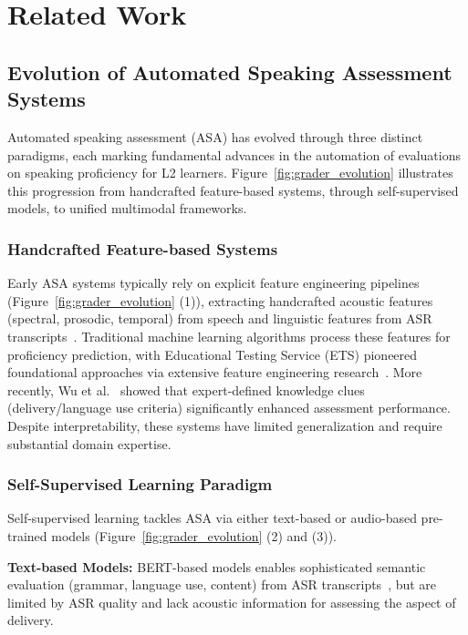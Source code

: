 \documentclass[conference]{IEEEtran}
\begin{document}
\section{Related Work}

\subsection{Evolution of Automated Speaking Assessment Systems}
Automated speaking assessment (ASA) has evolved through three distinct paradigms, each marking fundamental advances in the automation of evaluations on speaking proficiency for L2 learners. Figure~\ref{fig:grader_evolution} illustrates this progression from handcrafted feature-based systems, through self-supervised models, to unified multimodal frameworks.

\subsubsection{Handcrafted Feature-based Systems}
Early ASA systems typically rely on explicit feature engineering pipelines (Figure~\ref{fig:grader_evolution} (1)), extracting handcrafted acoustic features (spectral, prosodic, temporal) from speech and linguistic features from ASR transcripts~\cite{Davis80-COP}. Traditional machine learning algorithms process these features for proficiency prediction, with Educational Testing Service (ETS) pioneered foundational approaches via extensive feature engineering research~\cite{Loukina2015Feature,Xi2008Automated,Xie2012Exploring}. More recently, Wu et al.~\cite{AesWu2022_rocling} showed that expert-defined knowledge clues (delivery/language use criteria) significantly enhanced assessment performance. Despite interpretability, these systems have limited generalization and require substantial domain expertise.

\subsubsection{Self-Supervised Learning Paradigm}
Self-supervised learning tackles ASA via either text-based or audio-based pre-trained models (Figure~\ref{fig:grader_evolution} (2) and (3)).

\textbf{Text-based Models:} BERT-based models enables sophisticated semantic evaluation (grammar, language use, content) from ASR transcripts~\cite{Devlin2019BERT,WangEQM21}, but are limited by ASR quality and lack acoustic information for assessing the aspect of delivery.
\end{document}
